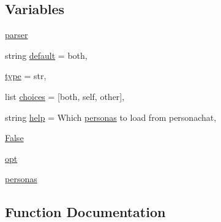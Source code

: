 \subsection*{Variables}
\begin{DoxyCompactItemize}
\item 
\hyperlink{namespaceparlai_1_1mturk_1_1tasks_1_1wizard__of__wikipedia_1_1extract__and__save__personas_a2fb2b0b8c441a0bc67e8b431a15091c8}{parser}
\item 
string \hyperlink{namespaceparlai_1_1mturk_1_1tasks_1_1wizard__of__wikipedia_1_1extract__and__save__personas_a3fce90fe49035faff8bd88981fed7287}{default} = \textquotesingle{}both\textquotesingle{},
\item 
\hyperlink{namespaceparlai_1_1mturk_1_1tasks_1_1wizard__of__wikipedia_1_1extract__and__save__personas_a3e46443fe5da2c4afc89e7bba7e6c342}{type} = str,
\item 
list \hyperlink{namespaceparlai_1_1mturk_1_1tasks_1_1wizard__of__wikipedia_1_1extract__and__save__personas_a97a557266316a9d1bbb85316c3c68f8a}{choices} = \mbox{[}\textquotesingle{}both\textquotesingle{}, \textquotesingle{}self\textquotesingle{}, \textquotesingle{}other\textquotesingle{}\mbox{]},
\item 
string \hyperlink{namespaceparlai_1_1mturk_1_1tasks_1_1wizard__of__wikipedia_1_1extract__and__save__personas_a91661b1682a641a454f205c324b1b045}{help} = \textquotesingle{}Which \hyperlink{namespaceparlai_1_1mturk_1_1tasks_1_1wizard__of__wikipedia_1_1extract__and__save__personas_a64d4a363d552b208b9e9e4a0ac5e9376}{personas} to load from personachat\textquotesingle{},
\item 
\hyperlink{namespaceparlai_1_1mturk_1_1tasks_1_1wizard__of__wikipedia_1_1extract__and__save__personas_aa9f8209bcbcc9884499c7e6dcb4536bd}{False}
\item 
\hyperlink{namespaceparlai_1_1mturk_1_1tasks_1_1wizard__of__wikipedia_1_1extract__and__save__personas_af9d0aef8b6fb53e14c74a449cf3c8a63}{opt}
\item 
\hyperlink{namespaceparlai_1_1mturk_1_1tasks_1_1wizard__of__wikipedia_1_1extract__and__save__personas_a64d4a363d552b208b9e9e4a0ac5e9376}{personas}
\end{DoxyCompactItemize}


\subsection{Function Documentation}
\mbox{\label{namespaceparlai_1_1mturk_1_1tasks_1_1wizard__of__wikipedia_1_1extract__and__save__personas_afa7facd2483fc5f31f7b87ced91385ad}} 
